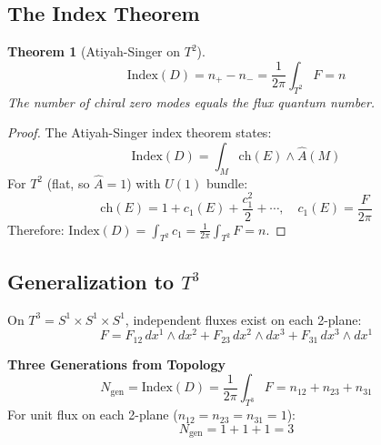 \documentclass[12pt,a4paper]{article}
\newtheorem{theorem}{Theorem}[section]
\theoremstyle{definition}
\theoremstyle{remark}
\newcommand{\Ngen}{N_{\mathrm{gen}}}
\newcommand{\Tthree}{T^3}
\newcommand{\Stwo}{T^2}
\begin{document}
\subsection{The Index Theorem}

\begin{theorem}[Atiyah-Singer on $\Stwo$]
\begin{equation}
\boxed{\mathrm{Index}(D) = n_+ - n_- = \frac{1}{2\pi} \int_{\Stwo} F = n}
\end{equation}
The number of chiral zero modes equals the flux quantum number.
\end{theorem}

\begin{proof}
The Atiyah-Singer index theorem states:
\begin{equation}
\mathrm{Index}(D) = \int_M \mathrm{ch}(E) \wedge \hat{A}(M)
\end{equation}
For $\Stwo$ (flat, so $\hat{A} = 1$) with $U(1)$ bundle:
\begin{equation}
\mathrm{ch}(E) = 1 + c_1(E) + \frac{c_1^2}{2} + \cdots, \quad c_1(E) = \frac{F}{2\pi}
\end{equation}
Therefore: $\mathrm{Index}(D) = \int_{\Stwo} c_1 = \frac{1}{2\pi} \int_{\Stwo} F = n$.
\end{proof}

\subsection{Generalization to $T^3$}

On $\Tthree = S^1 \times S^1 \times S^1$, independent fluxes exist on each 2-plane:
\begin{equation}
F = F_{12} \, dx^1 \wedge dx^2 + F_{23} \, dx^2 \wedge dx^3 + F_{31} \, dx^3 \wedge dx^1
\end{equation}

\begin{keyresult}
\textbf{Three Generations from Topology}
\begin{equation}
\boxed{\Ngen = \mathrm{Index}(D) = \frac{1}{2\pi} \int_{\Tthree} F = n_{12} + n_{23} + n_{31}}
\end{equation}
For unit flux on each 2-plane ($n_{12} = n_{23} = n_{31} = 1$):
\begin{equation}
\Ngen = 1 + 1 + 1 = 3
\end{equation}
\end{keyresult}

\end{document}
